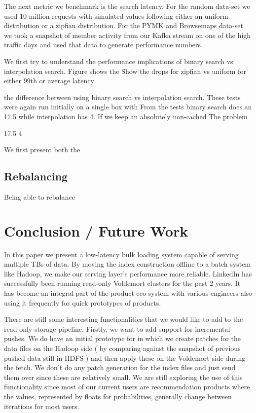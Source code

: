 \documentclass[10pt,twocolumn,preprint,natbib,authoryear]{sigplanconf}
\begin{document}
The next metric we benchmark is the search latency. For the random data-set we used 10 million requests with simulated values following either an uniform distribution or a zipfian distribution. For the PYMK and Browsemaps data-set we took a snapshot of member activity from our Kafka stream on one of the high traffic days and used that data to generate performance numbers. 

We first try to understand the performance implications of binary search vs interpolation search. Figure shows the Show the drops for zipfian vs uniform for either 99th or average latency

 the difference between using binary search vs interpolation search. These tests were again run initially on a single box with From the tests binary search does an  17.5 while interpolation has 4. If we keep an absolutely non-cached The problem 

17.5
4



We first present both the 



\subsection{Rebalancing}
\label{sec:benchmark:rebalancing}
Being able to rebalance




\section{Conclusion / Future Work}
\label{sec:conclusion}

In this paper we present a low-latency bulk loading system capable of serving multiple TBs of data. By moving the index construction offline to a batch system like Hadoop, we make our serving layer's performance more reliable. LinkedIn has successfully been running read-only Voldemort clusters for the past 2 years. It has become an integral part of the product eco-system with various engineers also using it frequently for quick prototypes of products. 

There are still some interesting functionalities that we would like to add to the read-only storage pipeline. Firstly, we want to add support for incremental pushes. We do have an initial prototype for in which we create patches for the data files on the Hadoop side ( by comparing against the snapshot of previous pushed data still in HDFS ) and then apply these on the Voldemort side during the fetch. We don't do any patch generation for the index files and just send them over since these are relatively small. We are still exploring the use of this functionality since most of our current users are recommendation products where the values, represented by floats for probabilities, generally change between iterations for most users. 
\end{document}
